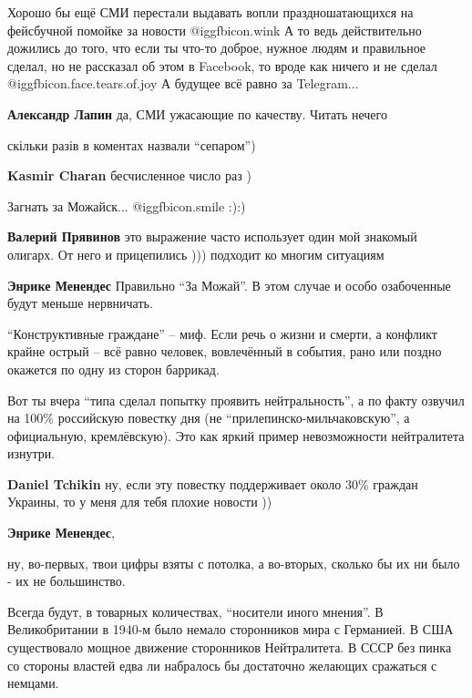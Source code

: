 \begin{itemize}
\begin{itemize}
\end{itemize} %


Хорошо бы ещё СМИ перестали выдавать вопли праздношатающихся на фейсбучной
помойке за новости @igg{fbicon.wink}  А то ведь действительно дожились до того, что если ты
что-то доброе, нужное людям и правильное сделал, но не рассказал об этом в
Facebook, то вроде как ничего и не сделал  @igg{fbicon.face.tears.of.joy}  А будущее всё равно за Telegram...

\textbf{Александр Лапин} да, СМИ ужасающие по качеству. Читать нечего

скільки разів в коментах назвали \enquote{сепаром})

\textbf{Kasmir Charan} бесчисленное число раз )


Загнать за Можайск...  @igg{fbicon.smile}  :):)

\begin{itemize} %
\textbf{Валерий Прявинов} это выражение часто использует один мой знакомый олигарх. От него и прицепились ))) подходит ко многим ситуациям

\textbf{Энрике Менендес} Правильно \enquote{За Можай}. В этом случае и особо озабоченные будут меньше нервничать.
\end{itemize} %


\enquote{Конструктивные граждане} – миф. Если речь о жизни и смерти, а конфликт крайне
острый – всё равно человек, вовлечённый в события, рано или поздно окажется по
одну из сторон баррикад.

Вот ты вчера \enquote{типа сделал попытку проявить нейтральность}, а по факту озвучил
на 100\% российскую повестку дня (не \enquote{прилепинско-мильчаковскую}, а
официальную, кремлёвскую). Это как яркий пример невозможности нейтралитета
изнутри.

\begin{itemize} %
\textbf{Daniel Tchikin} ну, если эту повестку поддерживает около 30\% граждан Украины, то у меня для тебя плохие новости ))

\textbf{Энрике Менендес}, 

ну, во-первых, твои цифры взяты с потолка, а во-вторых, сколько бы их ни было -
их не большинство.

Всегда будут, в товарных количествах, \enquote{носители иного мнения}. В Великобритании
в 1940-м было немало сторонников мира с Германией. В США существовало мощное
движение сторонников Нейтралитета. В СССР без пинка со стороны властей едва ли
набралось бы достаточно желающих сражаться с немцами.


\end{itemize}
\end{itemize}
